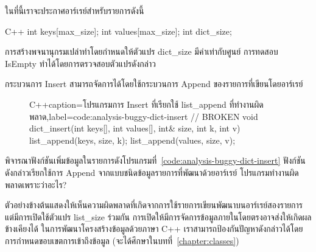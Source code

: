 ใน{\wbr}ที่นี้{\wbr}เรา{\wbr}จะ{\wbr}ประกาศ{\wbr}อาร์เรย์{\wbr}สำหรับ{\wbr}รายการ{\wbr}ดังนี้{\wbr}
\latintext
\begin{codelist}{C++}{}
int keys[max_size];
int values[max_size];
int dict_size;
\end{codelist}
\thaitext

การ{\wbr}สร้าง{\wbr}พจนานุกรม{\wbr}เปล่า{\wbr}ทำ{\wbr}โดย{\wbr}กำหนด{\wbr}ให้{\wbr}ตัวแปร {\ct dict\_size} มี{\wbr}ค่า{\wbr}เท่า{\wbr}กับ{\wbr}ศูนย์{\wbr}
การ{\wbr}ทดสอบ IsEmpty ทำ{\wbr}ได้{\wbr}โดย{\wbr}การ{\wbr}ตรวจสอบ{\wbr}ตัวแปร{\wbr}ดังกล่าว{\wbr}

กระบวนการ Insert สามารถ{\wbr}จัดการ{\wbr}ได้{\wbr}โดย{\wbr}ใช้{\wbr}กระบวนการ Append ของ{\wbr}รายการ{\wbr}ที่{\wbr}เขียน{\wbr}โดย{\wbr}อาร์เรย์

\begin{figure}
\latintext
\begin{codelist}{C++}{caption={\thaitext โปรแกรม{\wbr}การ Insert ที่{\wbr}เรียก{\wbr}ใช้ {\ct list\_append} ที่ทำงาน{\wbr}ผิดพลาด\latintext},label=code:analysis-buggy-dict-insert}
// BROKEN
void dict_insert(int keys[], int values[], int& size, 
                 int k, int v) 
{
  list_append(keys, size, k);
  list_append(values, size, v);
}
\end{codelist}
\thaitext
\end{figure}

\begin{quiz}{}
พิจารณา{\wbr}ฟังก์ชัน{\wbr}เพิ่ม{\wbr}ข้อมูล{\wbr}ใน{\wbr}รายการ{\wbr}ดัง{\wbr}โปรแกรม{\wbr}ที่~\ref{code:analysis-buggy-dict-insert}
ฟังก์ชัน{\wbr}ดังกล่าว{\wbr}เรียก{\wbr}ใช้{\wbr}การ Append จาก{\wbr}แบบ{\wbr}ชนิด{\wbr}ข้อมูล{\wbr}รายการ{\wbr}ที่{\wbr}พัฒนา{\wbr}ด้วย{\wbr}อาร์เรย์
โปรแกรม{\wbr}ทำงาน{\wbr}ผิดพลาด{\wbr}เพราะว่า{\wbr}อะไร? 
\end{quiz}

ตัวอย่าง{\wbr}ข้างต้น{\wbr}แสดง{\wbr}ให้{\wbr}เห็น{\wbr}ความผิด{\wbr}พลาด{\wbr}ที่{\wbr}เกิด{\wbr}จาก{\wbr}การ{\wbr}ใช้{\wbr}รายการ{\wbr}เขียน{\wbr}พัฒนา{\wbr}บน{\wbr}อาร์เรย์{\wbr}สอง{\wbr}รายการ{\wbr}
แต่{\wbr}มี{\wbr}การ{\wbr}เปิด{\wbr}ใช้{\wbr}ตัวแปร {\ct list\_size} ร่วม{\wbr}กัน{\wbr}
การ{\wbr}เปิด{\wbr}ให้{\wbr}มี{\wbr}การ{\wbr}จัดการ{\wbr}ข้อมูล{\wbr}ภายใน{\wbr}โดย{\wbr}ตรง{\wbr}อาจ{\wbr}ส่ง{\wbr}ให้{\wbr}เกิด{\wbr}ผลข้างเคียง{\wbr}ได้{\wbr}
ใน{\wbr}การ{\wbr}พัฒนา{\wbr}โครงสร้าง{\wbr}ข้อมูล{\wbr}ด้วย{\wbr}ภาษา C++
เรา{\wbr}สามารถ{\wbr}ป้องกัน{\wbr}ปัญหา{\wbr}ดังกล่าว{\wbr}ได้{\wbr}โดย{\wbr}การ{\wbr}กำหนด{\wbr}ขอบเขต{\wbr}การ{\wbr}เข้าถึง{\wbr}ข้อมูล{\wbr}
(จะ{\wbr}ได้{\wbr}ศึกษา{\wbr}ใน{\wbr}บท{\wbr}ที่~\ref{chapter:classes})

